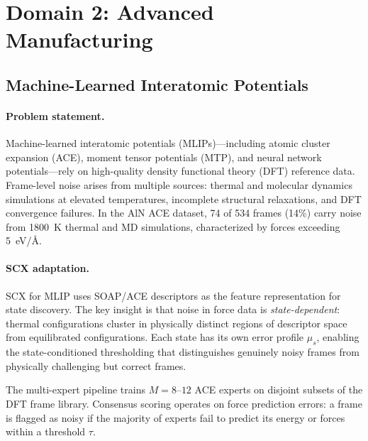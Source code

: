 \documentclass[twocolumn]{article}
\theoremstyle{definition}
\begin{document}
\section{Domain 2: Advanced Manufacturing}

\subsection{Machine-Learned Interatomic Potentials}

\paragraph{Problem statement.}
Machine-learned interatomic potentials (MLIPs)---including atomic cluster expansion (ACE), moment tensor potentials (MTP), and neural network potentials---rely on high-quality density functional theory (DFT) reference data. Frame-level noise arises from multiple sources: thermal and molecular dynamics simulations at elevated temperatures, incomplete structural relaxations, and DFT convergence failures. In the AlN ACE dataset, 74 of 534 frames (14\%) carry noise from 1800~K thermal and MD simulations, characterized by forces exceeding 5~eV/\AA \cite{paperIV, paperIII}.

\paragraph{SCX adaptation.}
SCX for MLIP uses SOAP/ACE descriptors as the feature representation for state discovery. The key insight is that noise in force data is \emph{state-dependent}: thermal configurations cluster in physically distinct regions of descriptor space from equilibrated configurations. Each state has its own error profile $\mu_s$, enabling the state-conditioned thresholding that distinguishes genuinely noisy frames from physically challenging but correct frames.

The multi-expert pipeline trains $M = 8$--$12$ ACE experts on disjoint subsets of the DFT frame library. Consensus scoring operates on force prediction errors: a frame is flagged as noisy if the majority of experts fail to predict its energy or forces within a threshold $\tau$.
\end{document}
